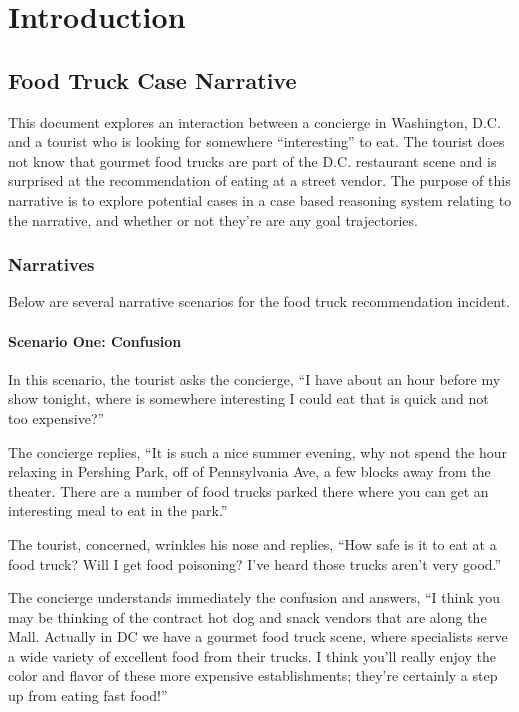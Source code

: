 
\renewcommand{\thechapter}{1}

\chapter{Introduction}

\section{Food Truck Case Narrative}

This document explores an interaction between a concierge in Washington, D.C. and a tourist who is looking for somewhere ``interesting'' to eat. The tourist does not know that gourmet food trucks are part of the D.C. restaurant scene and is surprised at the recommendation of eating at a street vendor. The purpose of this narrative is to explore potential cases in a case based reasoning system relating to the narrative, and whether or not they’re are any goal trajectories.
\subsection{Narratives}

Below are several narrative scenarios for the food truck recommendation incident.

\subsubsection{Scenario One: Confusion}

In this scenario, the tourist asks the concierge, “I have about an hour before my show tonight, where is somewhere interesting I could eat that is quick and not too expensive?”

The concierge replies, “It is such a nice summer evening, why not spend the hour relaxing in Pershing Park, off of Pennsylvania Ave, a few blocks away from the theater. There are a number of food trucks parked there where you can get an interesting meal to eat in the park.”

The tourist, concerned, wrinkles his nose and replies, “How safe is it to eat at a food truck? Will I get food poisoning? I’ve heard those trucks aren’t very good.”

The concierge understands immediately the confusion and answers, “I think you may be thinking of the contract hot dog and snack vendors that are along the Mall. Actually in DC we have a gourmet food truck scene, where specialists serve a wide variety of excellent food from their trucks. I think you’ll really enjoy the color and flavor of these more expensive establishments; they’re certainly a step up from eating fast food!”

